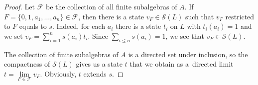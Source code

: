 \documentclass[10pt,a4paper]{amsart}
\begin{document}
\begin{proof}
Let $\mathcal F$ be the collection of all finite subalgebras of $A$. If
$F=\{0,1,a_1,\dots,a_n\}\in\mathcal F$,
then there is a state $v_F\in \mathcal{S}(L)$ such that $v_F$ restricted to $F$ equals to $s$.
Indeed, for each $a_i$ there is a state $t_i$ on $L$ with
$t_i(a_i)=1$ and we set $v_F=\sum_{i=1}^{n}s(a_i)t_i$.
Since $\sum_{i \leq n}s(a_i)=1$, we see that $v_F\in \mathcal{S}(L)$.

The collection of finite subalgebras of $A$ is a directed set under inclusion, so the compactness of $\mathcal{S}(L)$ gives us a state
$t$ that we obtain as a~directed limit $t=\lim\limits_{F\in\mathcal F}v_F$.
Obviously, $t$ extends $s$.
\end{proof}
\end{document}
